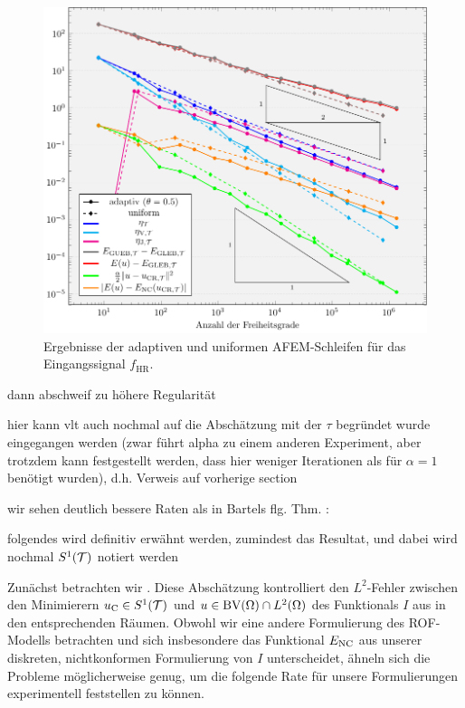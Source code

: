 \begin{figure}[p]
  \centering
  \includegraphics[width=\linewidth]
    {pictures/chapExperiments/secExactSol/f04/conv.pdf}
  \caption{Ergebnisse der adaptiven und uniformen AFEM-Schleifen für das 
  Eingangssignal $f_\textrm{HR}$.}
  \label{fig:f04Convergence}
\end{figure}

dann abschweif zu höhere Regularität

  hier kann vlt auch nochmal auf die Abschätzung mit der $\tau$ begründet wurde
  eingegangen werden (zwar führt alpha zu einem anderen Experiment, aber 
  trotzdem kann festgestellt werden, dass hier weniger Iterationen als für
  $\alpha=1$ benötigt wurden), d.h. Verweis auf vorherige section

  wir sehen deutlich bessere Raten als in Bartels flg. Thm. :

  folgendes wird definitiv erwähnt werden, zumindest das Resultat, und dabei
  wird nochmal $S^1(\mathcal{T})$ notiert werden

  Zunächst betrachten wir \cite[S. 309, Theorem 10.7]{Bar15}. Diese
  Abschätzung kontrolliert den
  $L^2$-Fehler zwischen den Minimierern $u_{\textup{C}}\in S^1(\mathcal{T})$ und
  $u\in\textup{BV}(\Omega)\cap L^2(\Omega)$ des Funktionals $I$ aus  in
  den entsprechenden Räumen. Obwohl wir eine andere Formulierung des ROF-Modells 
  betrachten und sich insbesondere das Funktional $E_\textup{NC}$ aus unserer diskreten,
  nichtkonformen Formulierung von $I$ unterscheidet, ähneln sich die 
  Probleme möglicherweise genug, um die folgende Rate für unsere Formulierungen
  experimentell feststellen zu können.
  
